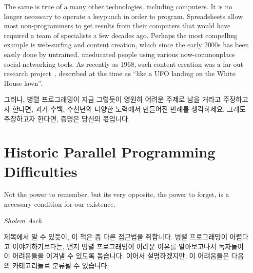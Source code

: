 The same is true of a many other technologies, including computers.
It is no longer necessary to operate a keypunch in order to program.
Spreadsheets allow most non-programmers to get results from their computers
that would have required a team of specialists a few decades ago.
Perhaps the most compelling example is web-surfing and content creation,
which since the early 2000s has been easily done by
untrained, uneducated people using various now-commonplace
social-networking tools.
As recently as 1968, such content creation was a far-out research
project~\cite{DouglasEngelbart1968}, described at
the time as
``like a UFO landing on the White House lawn''\cite{ScottGriffen2000}.
\fi

그러니, 병렬 프로그래밍이 지금 그렇듯이 영원히 어려운 주제로 남을 거라고
주장하고자 한다면, 과거 수백, 수천년의 다양한 노력에서 만들어진 반례를
생각하세요. 그래도 주장하고자 한다면, 증명은 당신의 몫입니다.

\section{Historic Parallel Programming Difficulties}
\label{sec:intro:Historic Parallel Programming Difficulties}
%
\epigraph{Not the power to remember, but its very opposite, the power to
	  forget, is a necessary condition for our existence.}
	 {\emph{Sholem Asch}}

제목에서 알 수 있듯이, 이 책은 좀 다른 접근법을 취합니다.
병렬 프로그래밍이 어렵다고 이야기하기보다는, 먼저 병렬 프로그래밍이 어려운
이유를 알아보고나서 독자들이 이 어려움들을 이겨낼 수 있도록 돕습니다.
이어서 설명하겠지만, 이 어려움들은 다음의 카테고리들로 분류될 수 있습니다:

